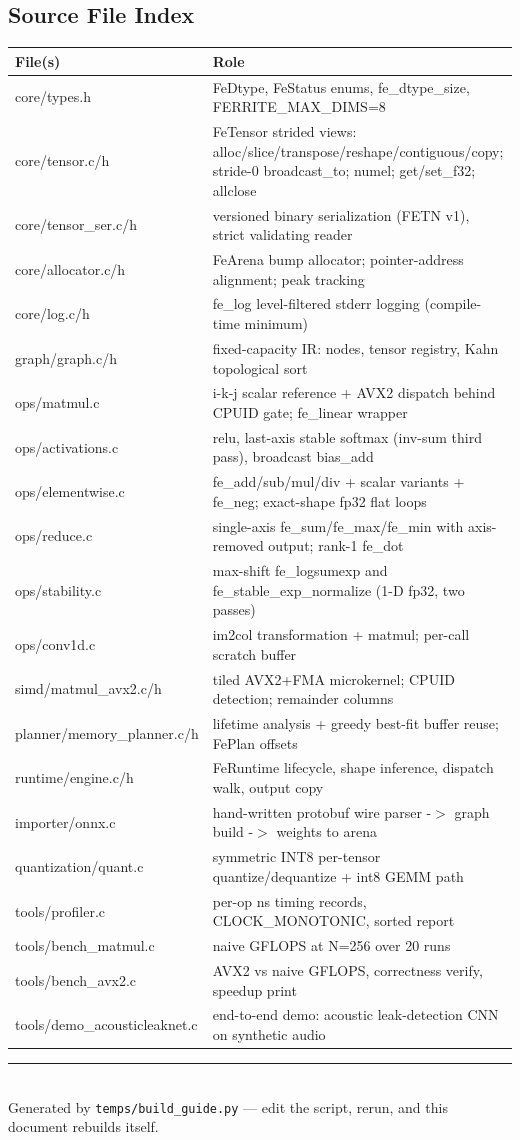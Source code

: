 \documentclass[11pt,a4paper]{article}
\begin{document}
\subsection{Source File Index}


\begin{tabularx}{\textwidth}{@{}l X@{}}
\toprule
\textbf{File(s)} & \textbf{Role} \\
\midrule
core/types.h & FeDtype, FeStatus enums, fe\_dtype\_size, FERRITE\_MAX\_DIMS=8 \\
core/tensor.c/h & FeTensor strided views: alloc/slice/transpose/reshape/contiguous/copy; stride-0 broadcast\_to; numel; get/set\_f32; allclose \\
core/tensor\_ser.c/h & versioned binary serialization (FETN v1), strict validating reader \\
core/allocator.c/h & FeArena bump allocator; pointer-address alignment; peak tracking \\
core/log.c/h & fe\_log level-filtered stderr logging (compile-time minimum) \\
graph/graph.c/h & fixed-capacity IR: nodes, tensor registry, Kahn topological sort \\
ops/matmul.c & i-k-j scalar reference + AVX2 dispatch behind CPUID gate; fe\_linear wrapper \\
ops/activations.c & relu, last-axis stable softmax (inv-sum third pass), broadcast bias\_add \\
ops/elementwise.c & fe\_add/sub/mul/div + scalar variants + fe\_neg; exact-shape fp32 flat loops \\
ops/reduce.c & single-axis fe\_sum/fe\_max/fe\_min with axis-removed output; rank-1 fe\_dot \\
ops/stability.c & max-shift fe\_logsumexp and fe\_stable\_exp\_normalize (1-D fp32, two passes) \\
ops/conv1d.c & im2col transformation + matmul; per-call scratch buffer \\
simd/matmul\_avx2.c/h & tiled AVX2+FMA microkernel; CPUID detection; remainder columns \\
planner/memory\_planner.c/h & lifetime analysis + greedy best-fit buffer reuse; FePlan offsets \\
runtime/engine.c/h & FeRuntime lifecycle, shape inference, dispatch walk, output copy \\
importer/onnx.c & hand-written protobuf wire parser -$>$ graph build -$>$ weights to arena \\
quantization/quant.c & symmetric INT8 per-tensor quantize/dequantize + int8 GEMM path \\
tools/profiler.c & per-op ns timing records, CLOCK\_MONOTONIC, sorted report \\
tools/bench\_matmul.c & naive GFLOPS at N=256 over 20 runs \\
tools/bench\_avx2.c & AVX2 vs naive GFLOPS, correctness verify, speedup print \\
tools/demo\_acousticleaknet.c & end-to-end demo: acoustic leak-detection CNN on synthetic audio \\
\bottomrule
\end{tabularx}


\vfill
\begin{center}
\color{fergray}\rule{0.6\textwidth}{0.4pt}\\[4pt]
\small Generated by \texttt{temps/build\_guide.py} --- edit the script, rerun,
and this document rebuilds itself.
\end{center}
\end{document}
